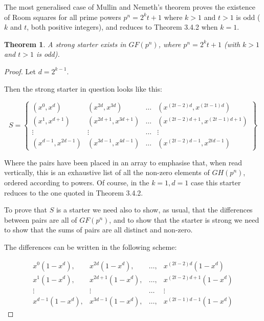 \documentclass[
  11pt,
  a4paper]{book}
\newtheorem{theorem}{Theorem}
\begin{document}
The most generalised case of Mullin and Nemeth's theorem
proves the existence of Room squares for all prime powers
\(p^n = 2^kt + 1\) where \(k > 1\) and \(t > 1\) is odd (\(k\) and \(t\),
both positive integers), and reduces to Theorem 3.4.2 when
\(k = 1\).

\begin{theorem}
A strong starter exists in $GF(p^n)$, where $p^n = 2^kt + 1$
(with $k > 1$ and $t > 1$ is odd).
\end{theorem}

\begin{proof}
Let $d = 2^{k-1}$.

Then the strong starter in question looks like this:

\begin{equation*}
S = \left\{
  \begin{array}{cccc}
    (x^0,x^d) & (x^{2d},x^{3d}) & \ldots & (x^{(2t - 2)d},x^{(2t - 1)d}) \\
    (x^1,x^{d + 1}) & (x^{2d + 1},x^{3d + 1}) & \ldots & (x^{(2t - 2){d + 1}},x^{(2t - 1){d + 1}}) \\
    \vdots & \vdots & \ldots & \vdots \\
    (x^{d - 1},x^{2d - 1}) & (x^{3d - 1},x^{4d - 1}) & \ldots & (x^{(2t - 2){d - 1}},x^{2td - 1})
  \end{array}
\right\}
\end{equation*}

Where the pairs have been placed in an array to emphasise
that, when read vertically, this is an exhaustive list of
all the non-zero elements of $GH(p^n)$, ordered according to
powers. Of course, in the $k = 1, d = 1$ case this starter
reduces to the one quoted in Theorem 3.4.2.

To prove that $S$ is a starter we need also to show, as
usual, that the differences between pairs are all of
$GF(p^n)$, and to show that the starter is strong we need to
show that the sums of pairs are all distinct and non-zero.

The differences can be written in the following scheme:

\begin{equation*}
  \begin{array}{cccc}
    x^0(1 - x^d), & x^{2d}(1 - x^d), & \ldots, & x^{(2t - 2)d}(1 - x^d) \\
    x^1(1 - x^d), & x^{2d + 1}(1 - x^d), & \ldots, & x^{(2t - 2)d + 1}(1 - x^d) \\
    \vdots & \vdots & \ldots & \vdots \\
    x^{d - 1}(1 - x^d), & x^{3d - 1}(1 - x^d), & \ldots, & x^{(2t - 1)d - 1}(1 - x^d)
  \end{array}
\end{equation*}


\end{proof}
\end{document}
